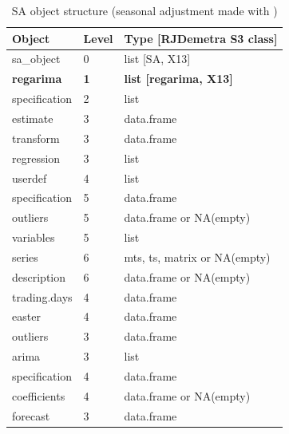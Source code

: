 \documentclass[article]{jss}
\begin{document}
\begin{longtable}{lll}
\caption{\label{tab:obj_tab_tramoseats}SA object structure (seasonal adjustment made with )}\\
\toprule
Object & Level & Type [RJDemetra S3 class]\\
\midrule
sa\_object & 0 & list [SA, X13]\\
\textbf{\hspace{1em}regarima} & \textbf{1} & \textbf{list [regarima, X13]}\\
\hspace{2em}specification & 2 & list\\
\hspace{3em}estimate & 3 & data.frame\\
\hspace{3em}transform & 3 & data.frame\\
\addlinespace
\hspace{3em}regression & 3 & list\\
\hspace{4em}userdef & 4 & list\\
\hspace{5em}specification & 5 & data.frame\\
\hspace{5em}outliers & 5 & data.frame or NA(empty)\\
\hspace{5em}variables & 5 & list\\
\addlinespace
\hspace{6em}series & 6 & mts, ts, matrix or NA(empty)\\
\hspace{6em}description & 6 & data.frame or NA(empty)\\
\hspace{4em}trading.days & 4 & data.frame\\
\hspace{4em}easter & 4 & data.frame\\
\hspace{3em}outliers & 3 & data.frame\\
\addlinespace
\hspace{3em}arima & 3 & list\\
\hspace{4em}specification & 4 & data.frame\\
\hspace{4em}coefficients & 4 & data.frame or NA(empty)\\
\hspace{3em}forecast & 3 & data.frame\\

\end{longtable}
\end{document}
